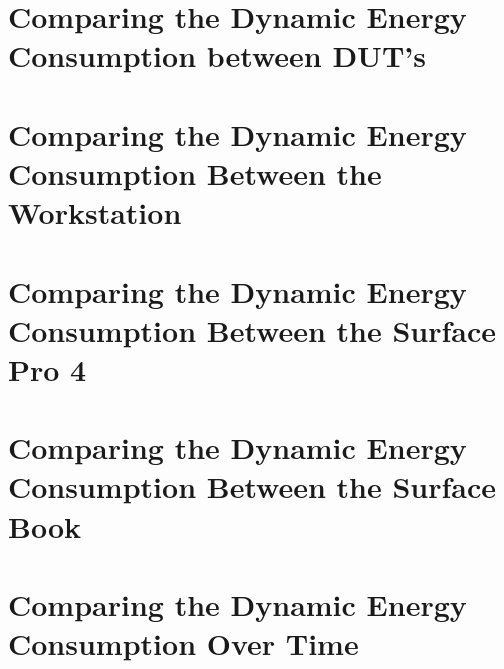 \section{Comparing the Dynamic Energy Consumption between DUT's}\label{app:comparison}




\section{Comparing the Dynamic Energy Consumption Between the Workstation}\label{app:comparison_workstation}



\section{Comparing the Dynamic Energy Consumption Between the Surface Pro 4}\label{app:comparison_surfacepro4}



\section{Comparing the Dynamic Energy Consumption Between the Surface Book}\label{app:comparison_surfacebook}



\section{Comparing the Dynamic Energy Consumption Over Time}\label{app:iterations}



